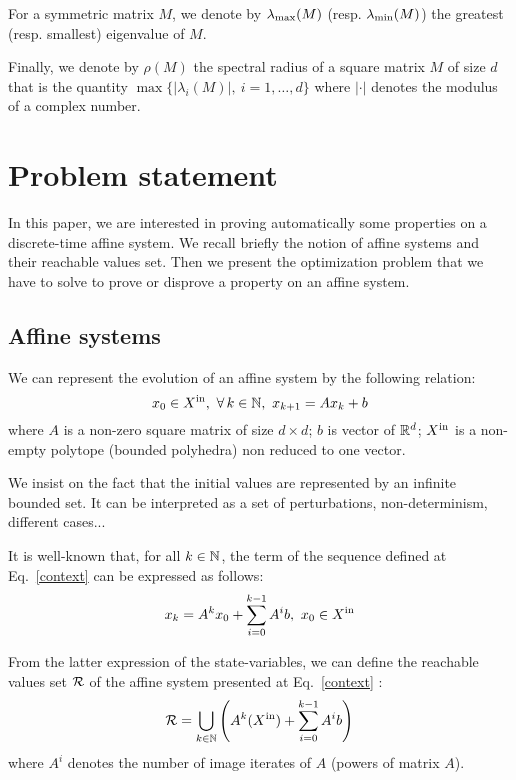 \documentclass[10pt]{llncs}
\begin{document}
For a symmetric matrix $M$, we denote by $\lambda_{\operatorname{max}}(M)$ (resp. $\lambda_{\operatorname{min}}(M)$) the greatest (resp. smallest) eigenvalue of $M$.


Finally, we denote by $\rho(M)$ the spectral radius of a square matrix $M$ of size $d$ that is the quantity $\max\{|\lambda_i(M)|,\ i=1,\ldots,d\}$ where $|\cdot|$ denotes the modulus of a complex number.


\section{Problem statement}
\label{statement}
In this paper, we are interested in proving automatically some properties on a discrete-time affine system. We recall briefly the notion of affine systems and their reachable values set. Then we present the optimization problem that we have to solve to prove or disprove a property on an affine system.
\subsection{Affine systems}
We can represent the evolution of an affine system by the following relation:
\begin{equation}
\label{context}
x_0\in X^\mathrm{in},\ \forall\, k\in\mathbb{N},\ x_{k+1}=A x_k + b  
\end{equation}
where $A$ is a non-zero square matrix of size $d\times d$; $b$ is vector of $\mathbb R^d$; $X^\mathrm{in}$ is a non-empty polytope (bounded polyhedra) non reduced to one vector. 

We insist on the fact that the initial values are represented by an infinite bounded set. It can be interpreted as a set of perturbations, non-determinism, different cases...

It is well-known that, for all $k\in\mathbb{N}$, the term of the sequence defined at Eq.~\eqref{context} can be expressed as follows:
\[
x_k=A^k x_0+ \sum_{i=0}^{k-1} A^i b,\ x_0\in\xin
\]

From the latter expression of the state-variables, we can define the reachable values set $\mathcal{R}$ of the affine system presented at Eq.~\eqref{context} :
\begin{equation}
\label{reach}
\mathcal{R}=\bigcup_{k\in \mathbb{N}} \left(A^{k}(X^\mathrm{in})+\sum_{i=0}^{k-1} A^i b\right)
\end{equation}
where $A^i$ denotes the number of image iterates of $A$ (powers of matrix $A$). 
\end{document}
